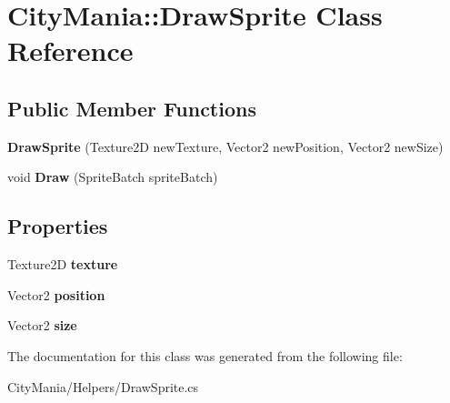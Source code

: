 \hypertarget{classCityMania_1_1DrawSprite}{
\section{CityMania::DrawSprite Class Reference}
\label{classCityMania_1_1DrawSprite}
}
\subsection*{Public Member Functions}
\begin{DoxyCompactItemize}
\item 
\hypertarget{classCityMania_1_1DrawSprite_ada4aaae783f0556892191dfb7641ce38}{
{\bfseries DrawSprite} (Texture2D newTexture, Vector2 newPosition, Vector2 newSize)}
\label{classCityMania_1_1DrawSprite_ada4aaae783f0556892191dfb7641ce38}

\item 
\hypertarget{classCityMania_1_1DrawSprite_a57e46bce3b16701d9dafc76a6555304f}{
void {\bfseries Draw} (SpriteBatch spriteBatch)}
\label{classCityMania_1_1DrawSprite_a57e46bce3b16701d9dafc76a6555304f}

\end{DoxyCompactItemize}
\subsection*{Properties}
\begin{DoxyCompactItemize}
\item 
\hypertarget{classCityMania_1_1DrawSprite_a17ab71e723996ec500763bd476938ec1}{
Texture2D {\bfseries texture}}
\label{classCityMania_1_1DrawSprite_a17ab71e723996ec500763bd476938ec1}

\item 
\hypertarget{classCityMania_1_1DrawSprite_af717de82a8f053e57e2a3ef430597c52}{
Vector2 {\bfseries position}}
\label{classCityMania_1_1DrawSprite_af717de82a8f053e57e2a3ef430597c52}

\item 
\hypertarget{classCityMania_1_1DrawSprite_a1c1e9c9c9aa8ef185d76467a8c9005be}{
Vector2 {\bfseries size}}
\label{classCityMania_1_1DrawSprite_a1c1e9c9c9aa8ef185d76467a8c9005be}

\end{DoxyCompactItemize}


The documentation for this class was generated from the following file:\begin{DoxyCompactItemize}
\item 
CityMania/Helpers/DrawSprite.cs\end{DoxyCompactItemize}
